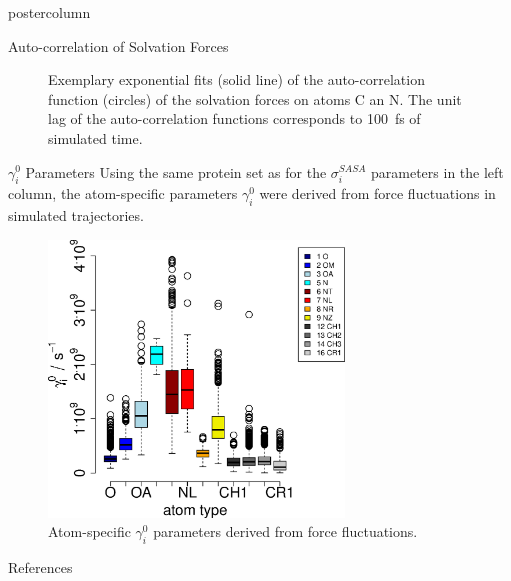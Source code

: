 \documentclass{beamer}
\newcommand{\sig}{$\sigma_i^{SASA}$}
\newcommand{\gam}{$\gamma_i^0$}
\begin{document}
\begin{frame}
\begin{columns}
\begin{column}{.45\textwidth}
\begin{beamercolorbox}[center]{postercolumn}
\begin{minipage}{.98\textwidth}
{\begin{myblock}{Auto-correlation of Solvation Forces}
\begin{figure}
\begin{minipage}{1.0\textwidth}
\caption{Exemplary exponential fits (solid line) of the auto-correlation function
(circles) of the solvation forces on atoms C an N. The unit lag of the 
auto-correlation functions corresponds to 100~fs of simulated time.}
\label{fig:expfit}
\end{minipage}
\end{figure}
\end{myblock}\vfill
\begin{myblock}{\gam{} Parameters}
Using the same protein set as for the \sig{} parameters in the left column,
the atom-specific parameters \gam{} were derived from force fluctuations 
in simulated trajectories.
\begin{figure}
\begin{minipage}{1.0\textwidth}
\centering\includegraphics[width=0.7\textwidth]{./boxplot_gamma.all.eps}
\caption{Atom-specific \gam{} parameters derived from force fluctuations.}
\label{fig:gammadstr}
\end{minipage}
\end{figure}
\end{myblock}\vfill
\begin{myblock}{References}
\footnotesize


\end{myblock}\vfill
}\end{minipage}
\end{beamercolorbox}
\end{column}
\end{columns}
\end{frame}
\end{document}
